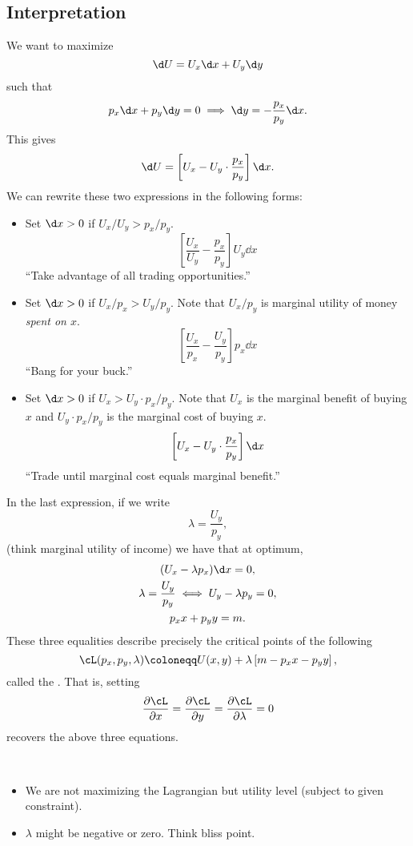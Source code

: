 \documentclass[oneside,reqno,letterpaper]{amsart}
\begin{document}
\subsection{Interpretation}
We want to maximize 
\[
  \d U = U_x \d x + U_y \d y 
\] 
such that 
\[
  p_x \d x + p_y \d y = 0 \implies 
  \d y = - \frac{p_x}{p_y} \d x . 
\] 
This gives 
\[
  \d U = \left[ U_x - U_y \cdot \frac{p_x}{p_y} \right] \d x . 
\] 
We can rewrite these two expressions in the following forms:
\begin{itemize}
  \item Set \(\d x > 0\) if \(U_x / U_y > p_x / p_y\). 
    \[
      \left[ \frac{U_x}{U_y} - \frac{p_x}{p_y} \right] U_y \dd x
    \] 
    ``Take advantage of all trading opportunities.''

  \item Set \(\d x > 0\) if \(U_x / p_x > U_y / p_y\). 
    Note that \(U_x / p_y\) is marginal utility of money \emph{spent on \(x\)}. 
    \[
      \left[ \frac{U_x}{p_x} - \frac{U_y}{p_y} \right] p_x \dd x
    \] 
    ``Bang for your buck.''
    
  \item Set \(\d x > 0\) if \(U_x > U_y \cdot p_x / p_y\). 
    Note that \(U_x\) is the marginal benefit of buying \(x\) and \(U_y \cdot p_x / p_y\) is the marginal cost of buying \(x\). 
    \[
      \left[ U_x - U_y \cdot \frac{p_x}{p_y} \right] \d x
    \] 
    ``Trade until marginal cost equals marginal benefit.''
\end{itemize}
In the last expression, if we write 
\[
  \lambda = \frac{U_y}{p_y}, 
\] 
(think marginal utility of income) we have that at optimum, 
\begin{gather*}
  (U_x - \lambda p_x) \d x = 0 , \\ 
  \lambda = \frac{U_y}{p_y} \iff U_y - \lambda p_y = 0 , \\ 
  p_x x + p_y y = m . 
\end{gather*}
These three equalities describe precisely the critical points of the following 
\[
  \cL(p_x, p_y, \lambda) \coloneqq
  U(x, y) + \lambda \left[ m - p_x x - p_y y \right], 
\] 
called the . 
That is, setting 
\[
  \frac{\partial \cL}{\partial x} = \frac{\partial \cL}{\partial y} = \frac{\partial \cL}{\partial \lambda} = 0
\] 
recovers the above three equations. 

\begin{remark}~
  \begin{itemize}
    \item We are not maximizing the Lagrangian but utility level (subject to given constraint).
    \item \(\lambda\) might be negative or zero. 
      Think bliss point. 
  \end{itemize}
\end{remark}
\end{document}
